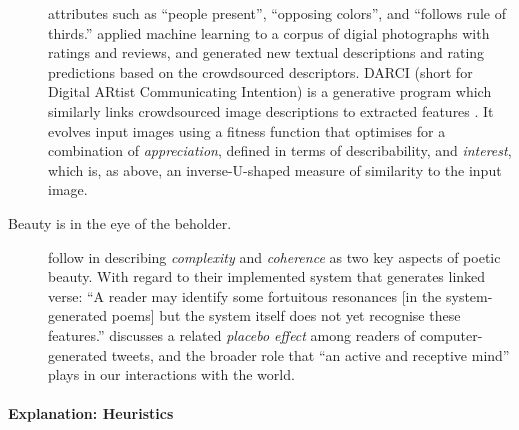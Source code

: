 \begin{description}
{    attributes} such as ``people present'', ``opposing colors'', and
  ``follows rule of thirds.''
  \citet{DBLP:journals/corr/abs-1802-10240} applied machine learning
  to a corpus of digial photographs with ratings and reviews, and
  generated new textual descriptions and rating predictions based on
  the crowdsourced descriptors.  {\sf DARCI} (short for Digital ARtist
  Communicating Intention) is a generative program which similarly
  links crowdsourced image descriptions to extracted features
  \cite{norton2013finding}.  It evolves input images using a fitness
  function that optimises for a combination of \emph{appreciation},
  defined in terms of describability, and \emph{interest}, which is,
  as above, an inverse-U-shaped measure of similarity to the input
  image.
\item[Beauty is in the eye of the beholder.] \citet{corneli2016x575}
  follow \citet{waugh1980poetic} in describing \emph{complexity} and
  \emph{coherence} as two key aspects of poetic beauty.  With regard
  to their implemented system that generates linked verse: ``A reader
  may identify some fortuitous resonances [in the system-generated
    poems] but the system itself does not yet recognise these
  features.''  \citet{veale2015game} discusses a related \emph{placebo
    effect} among readers of computer-generated tweets, and the
  broader role that ``an active and receptive mind'' plays in our
  interactions with the world.
\end{description}   

\paragraph{\textbf{\upshape Explanation: Heuristics}} 
                                         
